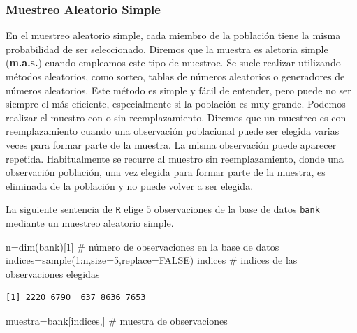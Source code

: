 \documentclass[
  letterpaper,
  DIV=11,
  numbers=noendperiod]{scrreprt}
\newenvironment{Shaded}{\begin{snugshade}}{\end{snugshade}}
\newcommand{\AttributeTok}[1]{\textcolor[rgb]{0.40,0.45,0.13}{#1}}
\newcommand{\CommentTok}[1]{\textcolor[rgb]{0.37,0.37,0.37}{#1}}
\newcommand{\ConstantTok}[1]{\textcolor[rgb]{0.56,0.35,0.01}{#1}}
\newcommand{\DecValTok}[1]{\textcolor[rgb]{0.68,0.00,0.00}{#1}}
\newcommand{\FunctionTok}[1]{\textcolor[rgb]{0.28,0.35,0.67}{#1}}
\newcommand{\NormalTok}[1]{\textcolor[rgb]{0.00,0.23,0.31}{#1}}
\newcommand{\OtherTok}[1]{\textcolor[rgb]{0.00,0.23,0.31}{#1}}
\newcommand{\SpecialCharTok}[1]{\textcolor[rgb]{0.37,0.37,0.37}{#1}}
\begin{document}
\hypertarget{muestreo-aleatorio-simple}{%
\subsubsection{Muestreo Aleatorio
Simple}\label{muestreo-aleatorio-simple}}

En el muestreo aleatorio simple, cada miembro de la población tiene la
misma probabilidad de ser seleccionado. Diremos que la muestra es
aletoria simple (\textbf{m.a.s.}) cuando empleamos este tipo de
muestroe. Se suele realizar utilizando métodos aleatorios, como sorteo,
tablas de números aleatorios o generadores de números aleatorios. Este
método es simple y fácil de entender, pero puede no ser siempre el más
eficiente, especialmente si la población es muy grande. Podemos realizar
el muestro con o sin reemplazamiento. Diremos que un muestreo es con
reemplazamiento cuando una observación poblacional puede ser elegida
varias veces para formar parte de la muestra. La misma observación puede
aparecer repetida. Habitualmente se recurre al muestro sin
reemplazamiento, donde una observación población, una vez elegida para
formar parte de la muestra, es eliminada de la población y no puede
volver a ser elegida.

La siguiente sentencia de \texttt{R} elige \(5\) observaciones de la
base de datos \texttt{bank} mediante un muestreo aleatorio simple.

\begin{Shaded}
\begin{Highlighting}[]
\NormalTok{n}\OtherTok{=}\FunctionTok{dim}\NormalTok{(bank)[}\DecValTok{1}\NormalTok{] }\CommentTok{\# número de observaciones en la base de datos}
\NormalTok{indices}\OtherTok{=}\FunctionTok{sample}\NormalTok{(}\DecValTok{1}\SpecialCharTok{:}\NormalTok{n,}\AttributeTok{size=}\DecValTok{5}\NormalTok{,}\AttributeTok{replace=}\ConstantTok{FALSE}\NormalTok{)}
\NormalTok{indices }\CommentTok{\# indices de las observaciones elegidas}
\end{Highlighting}
\end{Shaded}

\begin{verbatim}
[1] 2220 6790  637 8636 7653
\end{verbatim}

\begin{Shaded}
\begin{Highlighting}[]
\NormalTok{muestra}\OtherTok{=}\NormalTok{bank[indices,] }\CommentTok{\# muestra de observaciones }
\end{Highlighting}
\end{Shaded}
\end{document}
